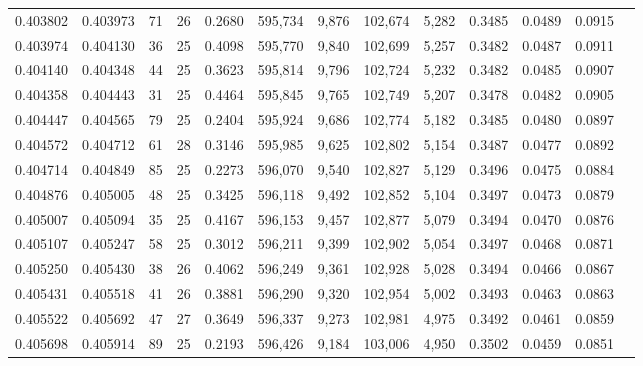 \begin{tabular}{rrrrrrrrrrrrr}
0.403802 & 0.403973 &    71 &  26 &                                     0.2680 & 595,734 &   9,876 & 102,674 &   5,282 & 0.3485 & 0.0489 & 0.0915 \\
0.403974 & 0.404130 &    36 &  25 &                                     0.4098 & 595,770 &   9,840 & 102,699 &   5,257 & 0.3482 & 0.0487 & 0.0911 \\
0.404140 & 0.404348 &    44 &  25 &                                     0.3623 & 595,814 &   9,796 & 102,724 &   5,232 & 0.3482 & 0.0485 & 0.0907 \\
0.404358 & 0.404443 &    31 &  25 &                                     0.4464 & 595,845 &   9,765 & 102,749 &   5,207 & 0.3478 & 0.0482 & 0.0905 \\
0.404447 & 0.404565 &    79 &  25 &                                     0.2404 & 595,924 &   9,686 & 102,774 &   5,182 & 0.3485 & 0.0480 & 0.0897 \\
0.404572 & 0.404712 &    61 &  28 &                                     0.3146 & 595,985 &   9,625 & 102,802 &   5,154 & 0.3487 & 0.0477 & 0.0892 \\
0.404714 & 0.404849 &    85 &  25 &                                     0.2273 & 596,070 &   9,540 & 102,827 &   5,129 & 0.3496 & 0.0475 & 0.0884 \\
0.404876 & 0.405005 &    48 &  25 &                                     0.3425 & 596,118 &   9,492 & 102,852 &   5,104 & 0.3497 & 0.0473 & 0.0879 \\
0.405007 & 0.405094 &    35 &  25 &                                     0.4167 & 596,153 &   9,457 & 102,877 &   5,079 & 0.3494 & 0.0470 & 0.0876 \\
0.405107 & 0.405247 &    58 &  25 &                                     0.3012 & 596,211 &   9,399 & 102,902 &   5,054 & 0.3497 & 0.0468 & 0.0871 \\
0.405250 & 0.405430 &    38 &  26 &                                     0.4062 & 596,249 &   9,361 & 102,928 &   5,028 & 0.3494 & 0.0466 & 0.0867 \\
0.405431 & 0.405518 &    41 &  26 &                                     0.3881 & 596,290 &   9,320 & 102,954 &   5,002 & 0.3493 & 0.0463 & 0.0863 \\
0.405522 & 0.405692 &    47 &  27 &                                     0.3649 & 596,337 &   9,273 & 102,981 &   4,975 & 0.3492 & 0.0461 & 0.0859 \\
0.405698 & 0.405914 &    89 &  25 &                                     0.2193 & 596,426 &   9,184 & 103,006 &   4,950 & 0.3502 & 0.0459 & 0.0851 \\

\end{tabular}
